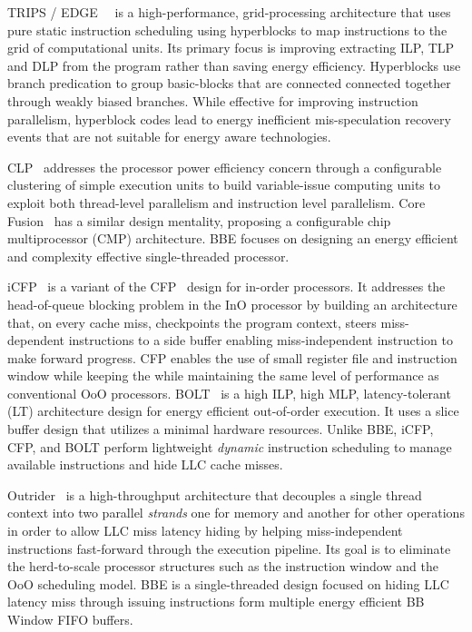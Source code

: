TRIPS / EDGE~\cite{edge}~\cite{trips} is a high-performance, grid-processing
architecture that uses pure static instruction scheduling using hyperblocks to
map instructions to the grid of computational units. Its primary focus is
improving extracting ILP, TLP and DLP from the program rather than saving energy
efficiency. Hyperblocks use branch predication to group basic-blocks that are
connected connected together through weakly biased branches. While effective for
improving instruction parallelism, hyperblock codes lead to energy inefficient
mis-speculation recovery events that are not suitable for energy aware
technologies.

CLP~\cite{clp} addresses the processor power efficiency concern through a
configurable clustering of simple execution units to build variable-issue
computing units to exploit both thread-level parallelism and instruction level
parallelism. Core Fusion~\cite{corefusion} has a similar design mentality,
    proposing a configurable chip multiprocessor (CMP) architecture. BBE focuses
    on designing an energy efficient and complexity effective single-threaded
    processor.

iCFP~\cite{icfp} is a variant of the CFP~\cite{cfp} design for in-order
processors. It addresses the head-of-queue blocking problem in the InO processor
by building an architecture that, on every cache miss, checkpoints the program
context, steers miss-dependent instructions to a side buffer enabling
miss-independent instruction to make forward progress. CFP enables the use of
small register file and instruction window while keeping the while maintaining
the same level of performance as conventional OoO processors.  BOLT~\cite{bolt}
is a high ILP, high MLP, latency-tolerant (LT) architecture design for energy
efficient out-of-order execution. It uses a slice buffer design that utilizes a
minimal hardware resources. Unlike BBE, iCFP, CFP, and BOLT perform lightweight
{\it{dynamic}} instruction scheduling to manage available instructions and hide
LLC cache misses.

Outrider~\cite{outrider} is a high-throughput architecture that decouples a
single thread context into two parallel {\it{strands}} one for memory and
another for other operations in order to allow LLC miss latency hiding by
helping miss-independent instructions fast-forward through the execution
pipeline. Its goal is to eliminate the herd-to-scale processor structures such
as the instruction window and the OoO scheduling model. BBE is a single-threaded
design focused on hiding LLC latency miss through issuing instructions form
multiple energy efficient BB Window FIFO buffers.

